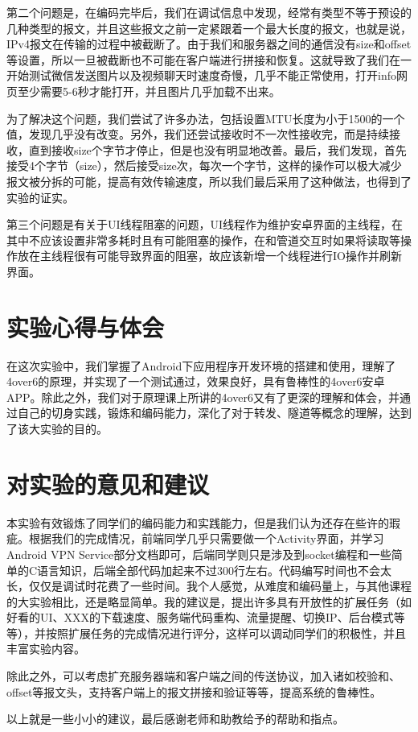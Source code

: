 \documentclass[paper=a4, fontsize=11pt, UTF8]{article} %
\numberwithin{equation}{section} %
\numberwithin{figure}{section} %
\numberwithin{table}{section} %
\begin{document}
第二个问题是，在编码完毕后，我们在调试信息中发现，经常有类型不等于预设的几种类型的报文，并且这些报文之前一定紧跟着一个最大长度的报文，也就是说，IPv4报文在传输的过程中被截断了。由于我们和服务器之间的通信没有size和offset等设置，所以一旦被截断也不可能在客户端进行拼接和恢复。这就导致了我们在一开始测试微信发送图片以及视频聊天时速度奇慢，几乎不能正常使用，打开info网页至少需要5-6秒才能打开，并且图片几乎加载不出来。

为了解决这个问题，我们尝试了许多办法，包括设置MTU长度为小于1500的一个值，发现几乎没有改变。另外，我们还尝试接收时不一次性接收完，而是持续接收，直到接收size个字节才停止，但是也没有明显地改善。最后，我们发现，首先接受4个字节（size），然后接受size次，每次一个字节，这样的操作可以极大减少报文被分拆的可能，提高有效传输速度，所以我们最后采用了这种做法，也得到了实验的证实。

第三个问题是有关于UI线程阻塞的问题，UI线程作为维护安卓界面的主线程，在其中不应该设置非常多耗时且有可能阻塞的操作，在和管道交互时如果将读取等操作放在主线程很有可能导致界面的阻塞，故应该新增一个线程进行IO操作并刷新界面。


\section{实验心得与体会}

在这次实验中，我们掌握了Android下应用程序开发环境的搭建和使用，理解了4over6的原理，并实现了一个测试通过，效果良好，具有鲁棒性的4over6安卓APP。除此之外，我们对于原理课上所讲的4over6又有了更深的理解和体会，并通过自己的切身实践，锻炼和编码能力，深化了对于转发、隧道等概念的理解，达到了该大实验的目的。

\section{对实验的意见和建议}

本实验有效锻炼了同学们的编码能力和实践能力，但是我们认为还存在些许的瑕疵。根据我们的完成情况，前端同学几乎只需要做一个Activity界面，并学习Android VPN Service部分文档即可，后端同学则只是涉及到socket编程和一些简单的C语言知识，后端全部代码加起来不过300行左右。代码编写时间也不会太长，仅仅是调试时花费了一些时间。我个人感觉，从难度和编码量上，与其他课程的大实验相比，还是略显简单。我的建议是，提出许多具有开放性的扩展任务（如好看的UI、XXX的下载速度、服务端代码重构、流量提醒、切换IP、后台模式等等），并按照扩展任务的完成情况进行评分，这样可以调动同学们的积极性，并且丰富实验内容。

除此之外，可以考虑扩充服务器端和客户端之间的传送协议，加入诸如校验和、offset等报文头，支持客户端上的报文拼接和验证等等，提高系统的鲁棒性。

以上就是一些小小的建议，最后感谢老师和助教给予的帮助和指点。
\end{document}
